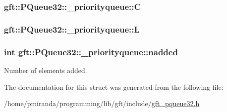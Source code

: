 \subsubsection[{\texorpdfstring{C}{C}}]{ gft\+::\+P\+Queue32\+::\+\_\+priorityqueue\+::C}\hypertarget{structgft_1_1PQueue32_1_1__priorityqueue_a6d54b970bf65337bb5b50b9e93b8af2c}{}\label{structgft_1_1PQueue32_1_1__priorityqueue_a6d54b970bf65337bb5b50b9e93b8af2c}
\subsubsection[{\texorpdfstring{L}{L}}]{ gft\+::\+P\+Queue32\+::\+\_\+priorityqueue\+::L}\hypertarget{structgft_1_1PQueue32_1_1__priorityqueue_a52881ee4fa383a2c8a237ebdc03a4c21}{}\label{structgft_1_1PQueue32_1_1__priorityqueue_a52881ee4fa383a2c8a237ebdc03a4c21}
\subsubsection[{\texorpdfstring{nadded}{nadded}}]{\setlength{\rightskip}{0pt plus 5cm}int gft\+::\+P\+Queue32\+::\+\_\+priorityqueue\+::nadded}\hypertarget{structgft_1_1PQueue32_1_1__priorityqueue_af5c8ac0e0628e1ebf95693aa7e2a40a3}{}\label{structgft_1_1PQueue32_1_1__priorityqueue_af5c8ac0e0628e1ebf95693aa7e2a40a3}


Number of elements added. 



The documentation for this struct was generated from the following file\+:\begin{DoxyCompactItemize}
\item 
/home/pmiranda/programming/lib/gft/include/\hyperlink{gft__pqueue32_8h}{gft\+\_\+pqueue32.\+h}\end{DoxyCompactItemize}
